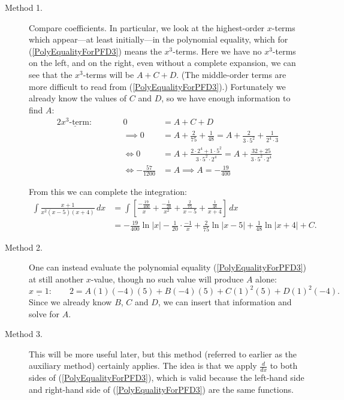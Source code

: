 \begin{description}
\item[Method 1.] Compare coefficients.  In particular, we look at the
highest-order $x$-terms which appear---at least initially---in 
the polynomial equality,
which for (\ref{PolyEqualityForPFD3}) means the $x^3$-terms.
Here we have no $x^3$-terms on the left, and on the right,
even without a complete expansion, we can see that 
the $x^3$-terms will be $A+C+D$.  (The middle-order terms are more
difficult to read from (\ref{PolyEqualityForPFD3}).)  Fortunately
we already know the values of $C$ and $D$, so we have enough
information to find $A$:
\begin{alignat*}{2}
\underline{x^3\text{-term}}:&\qquad&0&=A+C+D\\
                      &&\implies0&=A+\frac2{75}+\frac1{48}
                                  =A+\frac2{3\cdot5^2}+\frac1{2^4\cdot3}\\
                      &&\iff0&=A+\frac{2\cdot2^4+1\cdot5^2}{3\cdot5^2\cdot2^4}
                              =A+\frac{32+25}{3\cdot5^2\cdot2^4}\\
                      &&\iff-\frac{57}{1200}&=A\implies
                                \boxed{A=-\frac{19}{400}}
\end{alignat*}

From this we can complete the integration:
\begin{align*}\int\frac{x+1}{x^2(x-5)(x+4)}\,dx
&=\int\left[\frac{-\frac{19}{400}}{x}+\frac{-\frac1{20}}{x^2}
     +\frac{\frac2{75}}{x-5}+\frac{\frac1{48}}{x+4}\right]\,dx\\
&=-\frac{19}{400}\ln|x|-\frac1{20}\cdot\frac{-1}{x}+\frac2{75}\ln|x-5|
       +\frac1{48}\ln|x+4|+C.
\end{align*}
\item[Method 2.] One can instead evaluate the polynomial 
equality (\ref{PolyEqualityForPFD3}) at still another $x$-value,
though no such value will produce $A$ alone:
$$\underline{x=1}:\qquad 2=A(1)(-4)(5)
                     +B(-4)(5)+C(1)^2(5)+D(1)^2(-4).$$
Since we already know $B$, $C$ and $D$, we can insert that information
and solve for $A$. 
\item[Method 3.] This will be more useful later, but this method
(referred to earlier as the {\rm auxiliary} method) certainly applies.
The idea is that we apply $\frac{d}{dx}$ to both sides
of (\ref{PolyEqualityForPFD3}), which is valid because the left-hand
side and right-hand side of (\ref{PolyEqualityForPFD3})
are the same {\rm functions}.


\end{description}
